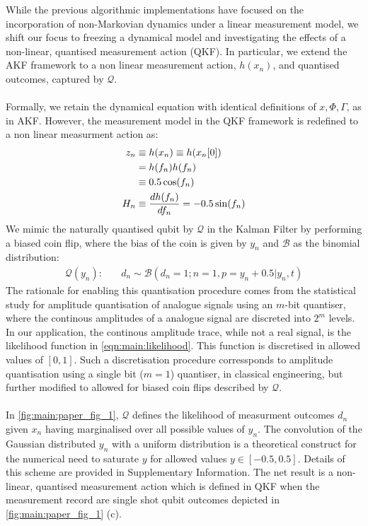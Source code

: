 While the previous algorithmic implementations have focused on the incorporation of non-Markovian dynamics under a linear measurement model, we shift our focus to freezing a dynamical model and investigating the effects of a non-linear, quantised measurement action (QKF). In particular, we extend the AKF framework to a non linear measurement action, $h(x_n)$, and quantised outcomes, captured by $\mathcal{Q}$. 
\\
\\
Formally, we retain the dynamical equation with identical definitions of $x, \Phi, \Gamma$, as in AKF.  However, the measurement model in the QKF framework is redefined to a non linear measurment action as:
\begin{align}
z_n & \equiv  h(x_n) \equiv h(x_n[0]) \\
& = h(f_n)h(f_n) \\
& \equiv  0.5\cos(f_{n}) \\
H_n &\equiv \frac{d h(f_n)}{df_n} =  -0.5\sin(f_{n})
\end{align}
We mimic the naturally quantised qubit by $\mathcal{Q}$  in the Kalman Filter by performing a biased coin flip, where the bias of the coin is given by $y_n$ and $\mathcal{B}$ as the binomial distribution: 
\begin{align}
\mathcal{Q}(y_n): &\quad  d_n \sim \mathcal{B}(d_n=1; n=1, p= y_n + 0.5 | y_n, t) 
\end{align}
The rationale for enabling this quantisation procedure comes from the statistical study for amplitude quantisation of analogue signals using an $m$-bit quantiser, where the continous amplitudes of a analogue signal are discreted into $2^m$ levels. In our application, the continous amplitude trace, while not a real signal, is the likelihood function in \cref{eqn:main:likelihood}. This function is discretised in allowed values of $ [0,1]$. Such a discretisation procedure corressponds to amplitude quantisation using a single bit ($m=1$) quantiser, in classical engineering, but further modified to allowed for biased coin flips described by $\mathcal{Q}$. 
\\
\\
In \cref{fig:main:paper_fig_1}, $\mathcal{Q}$ defines the likelihood of measurment outcomes $d_n$ given $x_n$ having marginalised over all possible values of $y_n$. The convolution of the Gaussian distributed $y_n$ with a uniform distribution is a theoretical construct for the numerical need to saturate $y$ for allowed values $y \in [-0.5, 0.5]$. Details of this  scheme are provided in Supplementary Information. The net result is a non-linear, quantised measurement action which is defined in QKF when the measurement record are single shot qubit outcomes depicted in \cref{fig:main:paper_fig_1} (c).


